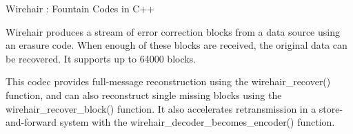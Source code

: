Wirehair \+: Fountain Codes in C++

Wirehair produces a stream of error correction blocks from a data source using an erasure code. When enough of these blocks are received, the original data can be recovered. It supports up to 64000 blocks.

This codec provides full-\/message reconstruction using the wirehair\+\_\+recover() function, and can also reconstruct single missing blocks using the wirehair\+\_\+recover\+\_\+block() function. It also accelerates retransmission in a store-\/and-\/forward system with the wirehair\+\_\+decoder\+\_\+becomes\+\_\+encoder() function. 